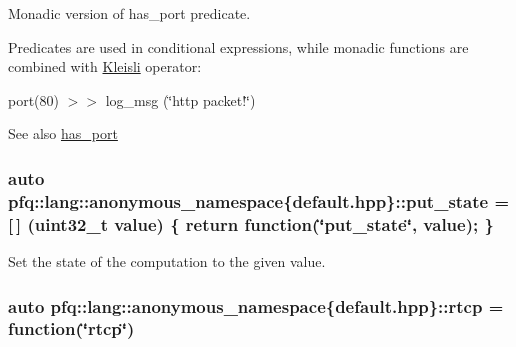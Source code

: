Monadic version of {\ttfamily has\+\_\+port} predicate. 

Predicates are used in conditional expressions, while monadic functions are combined with \hyperlink{structpfq_1_1lang_1_1Kleisli}{Kleisli} operator\+:

port(80) $>$$>$ log\+\_\+msg (\char`\"{}http packet!\char`\"{})

\begin{DoxySeeAlso}{See also}
\hyperlink{namespacepfq_1_1lang_1_1anonymous__namespace_02default_8hpp_03_a9f7161b8dfb842c5a845f413eb6bc82f}{has\+\_\+port} 
\end{DoxySeeAlso}
\subsubsection[{\texorpdfstring{put\+\_\+state}{put_state}}]{\setlength{\rightskip}{0pt plus 5cm}auto pfq\+::lang\+::anonymous\+\_\+namespace\{default.\+hpp\}\+::put\+\_\+state = \mbox{[}$\,$\mbox{]} (uint32\+\_\+t value) \{ return {\bf function}(\char`\"{}put\+\_\+state\char`\"{}, value); \}}\hypertarget{namespacepfq_1_1lang_1_1anonymous__namespace_02default_8hpp_03_afd94f51db878b2f70225c944c3f1d300}{}\label{namespacepfq_1_1lang_1_1anonymous__namespace_02default_8hpp_03_afd94f51db878b2f70225c944c3f1d300}


Set the state of the computation to the given value. 

\subsubsection[{\texorpdfstring{rtcp}{rtcp}}]{\setlength{\rightskip}{0pt plus 5cm}auto pfq\+::lang\+::anonymous\+\_\+namespace\{default.\+hpp\}\+::rtcp = {\bf function}(\char`\"{}rtcp\char`\"{})}\hypertarget{namespacepfq_1_1lang_1_1anonymous__namespace_02default_8hpp_03_ad16ac0dfb9ae7abc1db76ab8041bada3}{}\label{namespacepfq_1_1lang_1_1anonymous__namespace_02default_8hpp_03_ad16ac0dfb9ae7abc1db76ab8041bada3}


